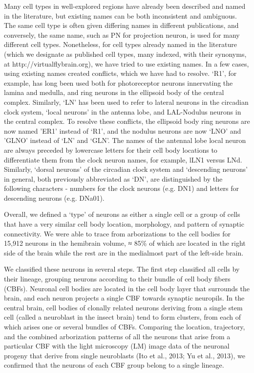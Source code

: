 \documentclass{article}
\begin{document}
Many cell types in well-explored regions have already been described and named in the literature, but existing names can be both inconsistent and ambiguous. The same cell type is often given differing names in different publications, and conversely, the same name, such as PN for projection neuron, is used for many different cell types. Nonetheless, for cell types already named in the literature (which we designate as published cell types, many indexed, with their synonyms, at http://virtualflybrain.org), we have tried to use existing names. In a few cases, using existing names created conflicts, which we have had to resolve. ‘R1’, for example, has long been used both for photoreceptor neurons innervating the lamina and medulla, and ring neurons in the ellipsoid body of the central complex. Similarly, ‘LN’ has been used to refer to lateral neurons in the circadian clock system, ‘local neurons’ in the antenna lobe, and LAL-Nodulus neurons in the central complex. To resolve these conflicts, the ellipsoid body ring neurons are now named ’ER1’ instead of ‘R1’, and the nodulus neurons are now ‘LNO’ and ’GLNO’ instead of ‘LN’ and ‘GLN’. The names of the antennal lobe local neuron are always preceded by lowercase letters for their cell body locations to differentiate them from the clock neuron names, for example, lLN1 versus LNd. Similarly, ‘dorsal neurons’ of the circadian clock system and ‘descending neurons’ in general, both previously abbreviated as ‘DN’, are distinguished by the following characters - numbers for the clock neurons (e.g. DN1) and letters for descending neurons (e.g. DNa01).

Overall, we defined a ‘type’ of neurons as either a single cell or a group of cells that have a very similar cell body location, morphology, and pattern of synaptic connectivity. We were able to trace from arborizations to the cell bodies for 15,912 neurons in the hemibrain volume, ≈ 85\% of which are located in the right side of the brain while the rest are in the medialmost part of the left-side brain.

We classified these neurons in several steps. The first step classified all cells by their lineage, grouping neurons according to their bundle of cell body fibers (CBFs). Neuronal cell bodies are located in the cell body layer that surrounds the brain, and each neuron projects a single CBF towards synaptic neuropils. In the central brain, cell bodies of clonally related neurons deriving from a single stem cell (called a neuroblast in the insect brain) tend to form clusters, from each of which arises one or several bundles of CBFs. Comparing the location, trajectory, and the combined arborization patterns of all the neurons that arise from a particular CBF with the light microscopy (LM) image data of the neuronal progeny that derive from single neuroblasts (Ito et al., 2013; Yu et al., 2013), we confirmed that the neurons of each CBF group belong to a single lineage.
\end{document}
